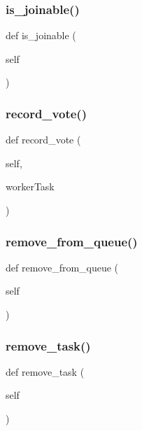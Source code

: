 \subsubsection{\texorpdfstring{is\_joinable()}{is\_joinable()}}
{\footnotesize\ttfamily def is\+\_\+joinable (\begin{DoxyParamCaption}\item[{}]{self }\end{DoxyParamCaption})}

\mbox{\label{classdynamicfilterapp_1_1models_1_1_i_p___pair_ad5b3eb8ce467b3f59a854be3fd0d10f1}} 
\subsubsection{\texorpdfstring{record\_vote()}{record\_vote()}}
{\footnotesize\ttfamily def record\+\_\+vote (\begin{DoxyParamCaption}\item[{}]{self,  }\item[{}]{worker\+Task }\end{DoxyParamCaption})}

\mbox{\label{classdynamicfilterapp_1_1models_1_1_i_p___pair_a438b59c52d810e87114f98c1996d6272}} 
\subsubsection{\texorpdfstring{remove\_from\_queue()}{remove\_from\_queue()}}
{\footnotesize\ttfamily def remove\+\_\+from\+\_\+queue (\begin{DoxyParamCaption}\item[{}]{self }\end{DoxyParamCaption})}

\mbox{\label{classdynamicfilterapp_1_1models_1_1_i_p___pair_a88c991de34eb29936f716526d4b7f86d}} 
\subsubsection{\texorpdfstring{remove\_task()}{remove\_task()}}
{\footnotesize\ttfamily def remove\+\_\+task (\begin{DoxyParamCaption}\item[{}]{self }\end{DoxyParamCaption})}

